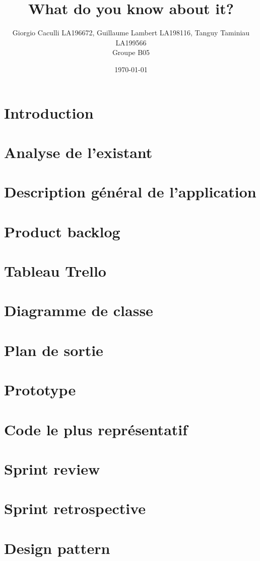 \documentclass[10pt]{article}
\title{What do you know about it?}
\author{Giorgio Caculli LA196672, Guillaume Lambert LA198116, Tanguy Taminiau LA199566 \\ Groupe B05}
\date{\today}
\begin{document}
\maketitle

\newpage
\tableofcontents

\newpage
\section*{Introduction}
\label{sec:intro}


\newpage
\section{Analyse de l'existant}


\section{Description général de l'application}


\section{Product backlog}


\section{Tableau Trello}


\newpage
\section{Diagramme de classe}


\newpage
\section{Plan de sortie}


\newpage
\section{Prototype}


\newpage
\section{Code le plus représentatif}


\newpage
\section{Sprint review}


\section{Sprint retrospective}


\section{Design pattern}


\newpage
\printglossary
\end{document}
